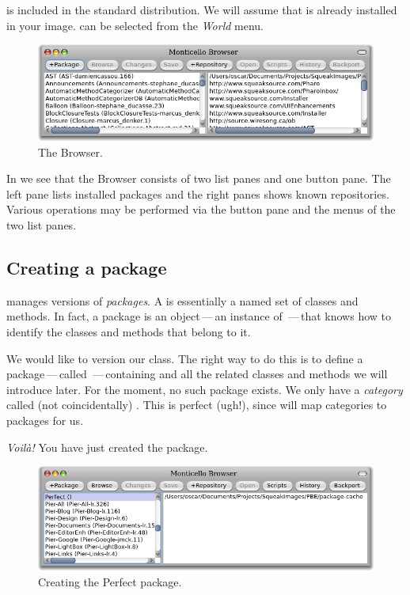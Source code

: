 \documentclass[a4paper,10pt,twoside]{book}
\begin{document}
\MC is included in the standard \pharo distribution.
We will assume that \MC is already installed in your image.
 can be selected from the \emph{World} menu.

\begin{figure}[ht]\centering
	\includegraphics[width=\textwidth]{monticelloBrowser}
	\caption{The \MC Browser.}
\end{figure}

In  we see that the \MC Browser consists of two list panes and one button pane. The left pane lists installed packages and the right panes shows known repositories.
Various operations may be performed via the button pane and the menus of the two list panes.

\subsection{Creating a package}

\MC manages versions of \emph{packages}.  A  is essentially a named set of classes and methods.
In fact, a package is an object\,---\,an instance of \,---\,that knows how to identify the classes and methods that belong to it.

We would like to version our  class. The right way to do this is to define a package\,---\,called \,---\,containing  and all the related classes and methods we will introduce later. For the moment, no such package exists. We only have a \emph{category} called (not coincidentally) . This is perfect (ugh!), since \MC will map categories to packages for us.


\emph{Voil\`a!} You have just created the  \MC package. 

\begin{figure}[ht]\centering
	\includegraphics[width=\textwidth]{perfectPackage}
	\caption{Creating the Perfect package.}
\end{figure}
\end{document}
